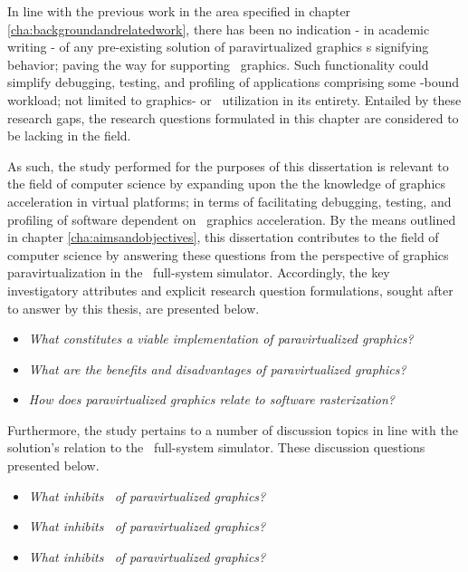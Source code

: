 In line with the previous work in the area specified in chapter \ref{cha:backgroundandrelatedwork}, there has been no indication - in academic writing - of any pre-existing solution of paravirtualized graphics \dvttermapi s signifying  behavior; paving the way for supporting \dvttermreverseexecution\ graphics.
Such functionality could simplify debugging, testing, and profiling of applications comprising some \dvttermgpu -bound workload; not limited to graphics- or \dvttermgpu\ utilization in its entirety.
Entailed by these research gaps, the research questions formulated in this chapter are considered to be lacking in the field.

As such, the study performed for the purposes of this dissertation is relevant to the field of computer science by expanding upon the the knowledge of graphics acceleration in virtual platforms; in terms of facilitating debugging, testing, and profiling of software dependent on \dvttermgpu\ graphics acceleration.
By the means outlined in chapter \ref{cha:aimsandobjectives}, this dissertation contributes to the field of computer science by answering these questions from the perspective of graphics paravirtualization in the \dvttermsimics\ full-system simulator.
Accordingly, the key investigatory attributes and explicit research question formulations, sought after to answer by this thesis, are presented below.

\newcommand*\researchquestionitem[2]{\item[#1:] \textit{#2}}
\begin{itemize}[noitemsep]
	\researchquestionitem{1}{What constitutes a viable implementation of paravirtualized graphics?}
	\researchquestionitem{2}{What are the benefits and disadvantages of paravirtualized graphics?}
	\researchquestionitem{3}{How does paravirtualized graphics relate to software rasterization?}
\end{itemize}

Furthermore, the study pertains to a number of discussion topics in line with the solution's relation to the \dvttermsimics\ full-system simulator. These discussion questions presented below.

\begin{itemize}[noitemsep]
	\researchquestionitem{1}{What inhibits \dvttermdeterministicexecution\ of paravirtualized graphics?}
	\researchquestionitem{2}{What inhibits \dvttermcheckpointing\ of paravirtualized graphics?}
	\researchquestionitem{3}{What inhibits \dvttermreverseexecution\ of paravirtualized graphics?}
\end{itemize}
